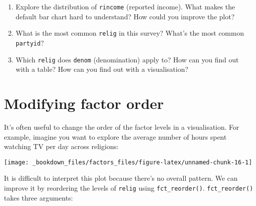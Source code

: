 \documentclass[]{book}
\newenvironment{Shaded}{\begin{snugshade}}{\end{snugshade}}
\newcommand{\KeywordTok}[1]{\textcolor[rgb]{0.13,0.29,0.53}{\textbf{{#1}}}}
\newcommand{\DataTypeTok}[1]{\textcolor[rgb]{0.13,0.29,0.53}{{#1}}}
\newcommand{\StringTok}[1]{\textcolor[rgb]{0.31,0.60,0.02}{{#1}}}
\newcommand{\OtherTok}[1]{\textcolor[rgb]{0.56,0.35,0.01}{{#1}}}
\newcommand{\NormalTok}[1]{{#1}}
\begin{document}
\begin{enumerate}
\def\labelenumi{\arabic{enumi}.}
\item
  Explore the distribution of \texttt{rincome} (reported income). What
  makes the default bar chart hard to understand? How could you improve
  the plot?
\item
  What is the most common \texttt{relig} in this survey? What's the most
  common \texttt{partyid}?
\item
  Which \texttt{relig} does \texttt{denom} (denomination) apply to? How
  can you find out with a table? How can you find out with a
  visualisation?
\end{enumerate}

\section{Modifying factor order}\label{modifying-factor-order}

It's often useful to change the order of the factor levels in a
visualisation. For example, imagine you want to explore the average
number of hours spent watching TV per day across religions:

\begin{Shaded}
\end{Shaded}

\begin{center}\texttt{[image: \_bookdown\_files/factors\_files/figure-latex/unnamed-chunk-16-1]} \end{center}

It is difficult to interpret this plot because there's no overall
pattern. We can improve it by reordering the levels of \texttt{relig}
using \texttt{fct\_reorder()}. \texttt{fct\_reorder()} takes three
arguments:
\end{document}
